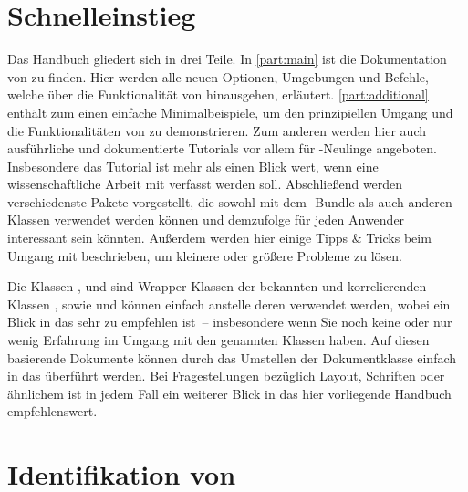 \section{Schnelleinstieg}

Das Handbuch gliedert sich in drei Teile. In \autoref{part:main} ist die 
Dokumentation von \TUDScript zu finden. Hier werden alle neuen Optionen, 
Umgebungen und Befehle, welche über die Funktionalität von \KOMAScript 
hinausgehen, erläutert. \autoref{part:additional} enthält zum einen einfache 
Minimalbeispiele, um den prinzipiellen Umgang und die Funktionalitäten von 
\TUDScript zu demonstrieren. Zum anderen werden hier auch ausführliche und 
dokumentierte Tutorials vor allem für -Neulinge angeboten. 
Insbesondere das Tutorial  ist mehr als einen Blick 
wert, wenn eine wissenschaftliche Arbeit mit  verfasst werden 
soll. Abschließend werden verschiedenste Pakete vorgestellt, die sowohl mit dem 
\TUDScript-Bundle als auch anderen -Klassen verwendet werden 
können und demzufolge für jeden Anwender interessant sein könnten. Außerdem 
werden hier einige Tipps \& Tricks beim Umgang mit  
beschrieben, um kleinere oder größere Probleme zu lösen.

Die Klassen ,  und  
sind Wrapper-Klassen der bekannten und korrelierenden \KOMAScript-Klassen 
,  sowie  und können einfach 
anstelle deren verwendet werden, wobei ein Blick in das \scrguide sehr zu 
empfehlen ist~-- insbesondere wenn Sie noch keine oder nur wenig Erfahrung im 
Umgang mit den genannten Klassen haben. Auf diesen basierende Dokumente können 
durch das Umstellen der Dokumentklasse einfach in das \TUDCD überführt werden. 
Bei Fragestellungen bezüglich Layout, Schriften oder ähnlichem ist in jedem 
Fall ein weiterer Blick in das hier vorliegende Handbuch empfehlenswert.



\section{Identifikation von \TUDScript}


